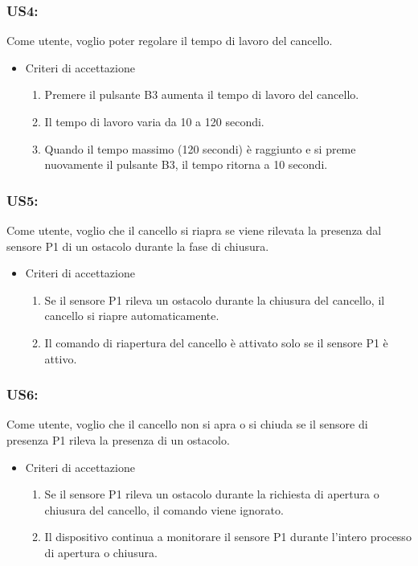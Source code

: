 \documentclass[12pt]{article}
\begin{document}
\subsubsection{US4:}
Come utente, voglio poter regolare il tempo di lavoro del cancello.
\begin{itemize}
    \item Criteri di accettazione
    \begin{enumerate}
        \item Premere il pulsante B3 aumenta il tempo di lavoro del cancello.
        \item Il tempo di lavoro varia da 10 a 120 secondi.
        \item Quando il tempo massimo (120 secondi) è raggiunto e si preme nuovamente il pulsante B3, il tempo ritorna a 10 secondi.
    \end{enumerate}
\end{itemize}
\subsubsection{US5:}
Come utente, voglio che il cancello si riapra se viene rilevata la presenza dal sensore P1 di un ostacolo durante la fase di chiusura.
\begin{itemize}
    \item Criteri di accettazione
    \begin{enumerate}
        \item Se il sensore P1 rileva un ostacolo durante la chiusura del cancello, il cancello si riapre automaticamente.
        \item Il comando di riapertura del cancello è attivato solo se il sensore P1 è attivo.
    \end{enumerate}
\end{itemize}
\subsubsection{US6:}
Come utente, voglio che il cancello non si apra o si chiuda se il sensore di presenza P1 rileva la presenza di un ostacolo.
\begin{itemize}
    \item Criteri di accettazione
    \begin{enumerate}
        \item Se il sensore P1 rileva un ostacolo durante la richiesta di apertura o chiusura del cancello, il comando viene ignorato.
        \item Il dispositivo continua a monitorare il sensore P1 durante l'intero processo di apertura o chiusura.
    \end{enumerate}
\end{itemize}
\end{document}
